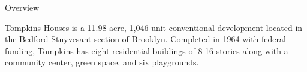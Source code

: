Overview 

Tompkins Houses is a 11.98-acre, 1,046-unit conventional development located in the Bedford-Stuyvesant section of Brooklyn. Completed in 1964 with federal funding, Tompkins has eight residential buildings of 8-16 stories along with a community center, green space, and six playgrounds. 